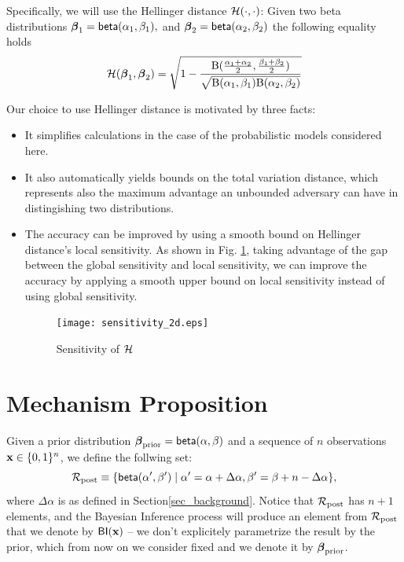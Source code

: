 \documentclass{article}
\begin{document}
Specifically, we will use the Hellinger distance $\mathcal{H}(\cdot,\cdot)$:
Given two beta distributions
$\boldsymbol{\beta}_1=\mathsf{beta}(\alpha_1, \beta_1),$ and $\boldsymbol{\beta}_2=\mathsf{beta}(\alpha_2, \beta_2)$ the following equality holds 
\[
  \mathcal{H}(\boldsymbol{\beta}_1, \boldsymbol{\beta}_2)=
  \sqrt{1 - \frac{\textup{B}(\frac{\alpha_1 + \alpha_2}{2}, \frac{\beta_1 + \beta_2}{2})}{\sqrt{\textup{B}(\alpha_1,\beta_1)\textup{B}(\alpha_2,\beta_2)}}}
\]

Our choice to use Hellinger distance is motivated by three facts:
\begin{itemize}
\item It simplifies calculations in the case of the probabilistic models considered here.
\item It also automatically yields bounds on the total variation distance, which represents also the maximum advantage
an unbounded adversary can have in distingishing two distributions. 
\item The accuracy can be improved by using a smooth bound on Hellinger distance's local sensitivity. As shown in Fig. \ref{fig_sensitivity}, taking advantage of the gap between the global sensitivity and local sensitivity, we can improve the accuracy by applying a smooth upper bound on local sensitivity instead of using global sensitivity.
\begin{figure}[ht]
\centering
\texttt{[image: sensitivity\_2d.eps]}
\caption{{Sensitivity of $\mathcal{H}$}}
\label{fig_sensitivity}
\end{figure}
\end{itemize}



\section{Mechanism Proposition}
\label{sec_mechs}
Given a prior distribution $\boldsymbol{\beta}_{\textup{prior}}=\mathsf{beta}(\alpha, \beta)$ and a sequence of $n$ observations $\textbf{x}\in\{0,1\}^n$, we define the follwing set:
\[
  \mathcal{R}_{\textup{post}}\equiv\{\mathsf{beta}(\alpha',\beta')\mid \alpha'=\alpha+\Delta\alpha, \beta'=\beta+n-\Delta\alpha\},
\]
where $\Delta\alpha$ is as defined in Section\ref{sec_background}.
Notice that $\mathcal{R}_{\textup{post}}$ has $n + 1$ elements, and
the Bayesian Inference process will produce an element from $\mathcal{R}_{\textup{post}}$
that we denote by $\mathsf{BI}(\textbf{x})$ -- we don't explicitely
parametrize the result by the prior, which from now on we consider
fixed and we denote it by $\boldsymbol{\beta}_{\textup{prior}}$.
\end{document}
